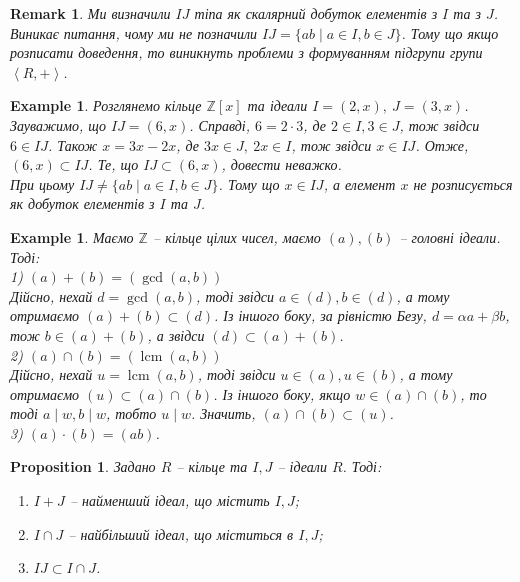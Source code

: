\documentclass[a4paper, 10pt]{article}
\theoremstyle{theoremdd}
\theoremstyle{theoremdd}
\theoremstyle{theoremdd}
\theoremstyle{theoremdd}
\theoremstyle{theoremdd}
\newtheorem{example}[theorem]{Example}
\theoremstyle{theoremdd}
\theoremstyle{theoremdd}
\theoremstyle{theoremdd}
\theoremstyle{theoremdd}
\newtheorem{proposition}[theorem]{Proposition}
\theoremstyle{theoremdd}
\theoremstyle{theoremdd}
\newtheorem{remark}[theorem]{Remark}
\theoremstyle{theoremdd}
\theoremstyle{theoremdd}
\theoremstyle{theoremdd}
\theoremstyle{theoremdd}
\DeclareMathOperator{\lcm}{lcm}
\begin{document}
\begin{remark}
Ми визначили $IJ$ тіпа як скалярний добуток елементів з $I$ та з $J$. Виникає питання, чому ми не позначили $IJ = \{ab \mid a \in I, b \in J\}$. Тому що якщо розписати доведення, то виникнуть проблеми з формуванням підгрупи групи $\left<R,+\right>$.
\end{remark}

\begin{example}
Розглянемо кільце $\mathbb{Z}[x]$ та ідеали $I = (2,x),\ J = (3,x)$. Зауважимо, що $IJ = (6,x)$. Справді, $6 = 2 \cdot 3$, де $2 \in I, 3 \in J$, тож звідси $6 \in IJ$. Також $x = 3x - 2x$, де $3x \in J,\ 2x \in I$, тож звідси $x \in IJ$. Отже, $(6,x) \subset IJ$. Те, що $IJ \subset (6,x)$, довести неважко.\\
При цьому $IJ \neq \{ ab \mid a \in I, b \in J \}$. Тому що $x \in IJ$, а елемент $x$ не розписується як добуток елементів з $I$ та $J$.
\end{example}

\begin{example}
Маємо $\mathbb{Z}$ -- кільце цілих чисел, маємо $(a),(b)$ -- головні ідеали. Тоді:\\
1) $(a) + (b) = (\gcd(a,b))$\\
Дійсно, нехай $d = \gcd(a,b)$, тоді звідси $a \in (d), b \in (d)$, а тому отримаємо $(a)+(b) \subset (d)$. Із іншого боку, за рівністю Безу, $d = \alpha a + \beta b$, тож $b \in (a) + (b)$, а звідси $(d) \subset (a) + (b)$.
\bigskip \\
2) $(a) \cap (b) = (\lcm(a,b))$\\
Дійсно, нехай $u = \lcm(a,b)$, тоді звідси $u \in (a), u \in (b)$, а тому отримаємо $(u) \subset (a) \cap (b)$. Із іншого боку, якщо $w \in (a) \cap (b)$, то тоді $a \mid w, b \mid w$, тобто $u \mid w$. Значить, $(a) \cap (b) \subset (u)$.
\bigskip \\
3) $(a) \cdot (b) = (ab)$.
\end{example}

\begin{proposition}
Задано $R$ -- кільце та $I,J$ -- ідеали $R$. Тоді:
\begin{enumerate}[nosep,wide=0pt,label={\arabic*)}]
\item $I+J$ -- найменший ідеал, що містить $I,J$;
\item $I \cap J$ -- найбільший ідеал, що міститься в $I,J$;
\item $IJ \subset I \cap J$.
\end{enumerate}
\end{proposition}
\end{document}
